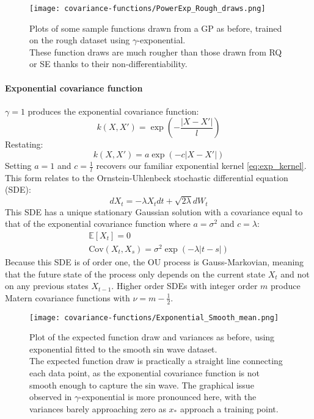 \begin{figure}[H]
    \texttt{[image: covariance-functions/PowerExp\_Rough\_draws.png]}
    \caption{
        Plots of some sample functions drawn from a GP as before, trained on the rough dataset using $\gamma$-exponential. \\
        These function draws are much rougher than those drawn from RQ or SE thanks to their non-differentiability.
    }
\end{figure}

\paragraph{Exponential covariance function}
$\gamma = 1$ produces the exponential covariance function:
\begin{equation*}
    k(X,X') = \exp \left(-\frac{|X - X'|}{l} \right)
\end{equation*}
Restating:
\begin{equation*}
    k(X, X') = a \exp\left(-c |X - X'|\right)
\end{equation*}
    Setting $a = 1$ and $c = \frac{1}{l}$ recovers our familiar exponential kernel \ref{eq:exp_kernel}. This form relates to the Ornstein-Uhlenbeck \cite{orny} stochastic differential equation (SDE):
\begin{equation*}
    dX_t = -\lambda X_t dt + \sqrt{2\lambda} dW_t
\end{equation*}
    This SDE has a unique stationary Gaussian solution \cite{orny} with a covariance equal to that of the exponential covariance function where $a = \sigma^2$ and $c = \lambda$:
\begin{equation*}
    \begin{aligned}
        \mathbb{E}[X_t] = 0 \\
        \text{Cov}(X_t, X_s) = \sigma^2 \exp \left( -\lambda |t - s| \right)
    \end{aligned}
\end{equation*}
    Because this SDE is of order one, the OU process is Gauss-Markovian, meaning that the future state of the process only depends on the current state $X_t$ and not on any previous states $X_{t-1}$. Higher order SDEs with integer order $m$ produce Matern covariance functions with $\nu = m - \frac{1}{2}$.

\begin{figure}[H]
    \texttt{[image: covariance-functions/Exponential\_Smooth\_mean.png]}
    \caption{
        Plot of the expected function draw and variances as before, using exponential fitted to the smooth sin wave dataset. \\
        The expected function draw is practically a straight line connecting each data point, as the exponential covariance function is not smooth enough to capture the sin wave. The graphical issue observed in $\gamma$-exponential is more pronounced here, with the variances barely approaching zero as $x_*$ approach a training point.
    }
\end{figure}

